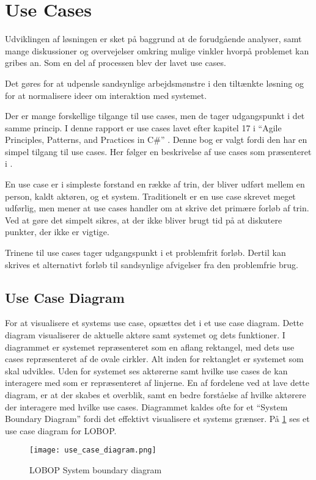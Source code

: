 \section{Use Cases}

Udviklingen af løsningen er sket på baggrund at de forudgående analyser, samt mange diskussioner og overvejelser omkring mulige vinkler hvorpå problemet kan gribes an. Som en del af processen blev der lavet use cases. 

Det gøres for at udpensle sandsynlige arbejdsmønstre i den tiltænkte løsning og for at normalisere ideer om interaktion med systemet.

Der er mange forskellige tilgange til use cases, men de tager udgangspunkt i det samme princip. I denne rapport er use cases lavet efter kapitel 17 i \enquote{Agile Principles, Patterns, and Practices in C\#} \cite{martin2006agile}. Denne bog er valgt fordi den har en simpel tilgang til use cases. Her følger en beskrivelse af use cases som præsenteret i \cite{martin2006agile}.

En use case er i simpleste forstand en række af trin, der bliver udført mellem en person, kaldt aktøren, og et system. Traditionelt er en use case skrevet meget udførlig, men \cite{martin2006agile} mener at use cases handler om at skrive det primære forløb af trin. Ved at gøre det simpelt sikres, at der ikke bliver brugt tid på at diskutere punkter, der ikke er vigtige. 

Trinene til use cases tager udgangspunkt i et problemfrit forløb. Dertil kan skrives et alternativt forløb til sandsynlige afvigelser fra den problemfrie brug.

\subsection{Use Case Diagram}
For at visualisere et systems use case, opsættes det i et use case diagram. Dette diagram visualiserer de aktuelle aktøre samt systemet og dets funktioner. I diagrammet er systemet repræsenteret som en aflang rektangel, med dets use cases repræsenteret af de ovale cirkler. Alt inden for rektanglet er systemet som skal udvikles. Uden for systemet ses aktørerne samt hvilke use cases de kan interagere med som er repræsenteret af linjerne. En af fordelene ved at lave dette diagram, er at der skabes et overblik, samt en bedre forståelse af hvilke aktørere der interagere med hvilke use cases. Diagrammet kaldes ofte for et \enquote{System Boundary Diagram} fordi det effektivt visualisere et systems grænser. På \cref{fig:usecase} ses et use case diagram for LOBOP.
\begin{figure}[h]
  \centering
    \texttt{[image: use\_case\_diagram.png]}
  \caption{LOBOP System boundary diagram}
  \label{fig:usecase}
\end{figure}


